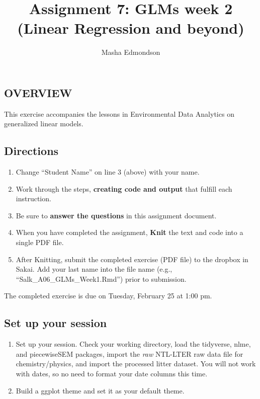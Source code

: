 \documentclass[]{article}
\title{Assignment 7: GLMs week 2 (Linear Regression and beyond)}
\author{Masha Edmondson}
\date{}
\providecommand{\tightlist}{%
  \setlength{\itemsep}{0pt}\setlength{\parskip}{0pt}}
\begin{document}
\maketitle

\hypertarget{overview}{%
\subsection{OVERVIEW}\label{overview}}

This exercise accompanies the lessons in Environmental Data Analytics on
generalized linear models.

\hypertarget{directions}{%
\subsection{Directions}\label{directions}}

\begin{enumerate}
\def\labelenumi{\arabic{enumi}.}
\tightlist
\item
  Change ``Student Name'' on line 3 (above) with your name.
\item
  Work through the steps, \textbf{creating code and output} that fulfill
  each instruction.
\item
  Be sure to \textbf{answer the questions} in this assignment document.
\item
  When you have completed the assignment, \textbf{Knit} the text and
  code into a single PDF file.
\item
  After Knitting, submit the completed exercise (PDF file) to the
  dropbox in Sakai. Add your last name into the file name (e.g.,
  ``Salk\_A06\_GLMs\_Week1.Rmd'') prior to submission.
\end{enumerate}

The completed exercise is due on Tuesday, February 25 at 1:00 pm.

\hypertarget{set-up-your-session}{%
\subsection{Set up your session}\label{set-up-your-session}}

\begin{enumerate}
\def\labelenumi{\arabic{enumi}.}
\item
  Set up your session. Check your working directory, load the tidyverse,
  nlme, and piecewiseSEM packages, import the \emph{raw} NTL-LTER raw
  data file for chemistry/physics, and import the processed litter
  dataset. You will not work with dates, so no need to format your date
  columns this time.
\item
  Build a ggplot theme and set it as your default theme.
\end{enumerate}
\end{document}
